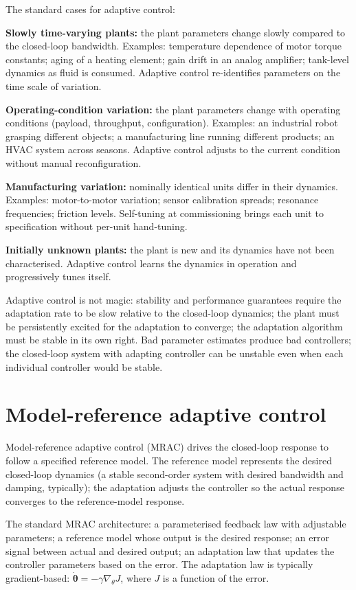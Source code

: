 The standard cases for adaptive control:

\textbf{Slowly time-varying plants:} the plant parameters change slowly compared to the closed-loop bandwidth. Examples: temperature dependence of motor torque constants; aging of a heating element; gain drift in an analog amplifier; tank-level dynamics as fluid is consumed. Adaptive control re-identifies parameters on the time scale of variation.

\textbf{Operating-condition variation:} the plant parameters change with operating conditions (payload, throughput, configuration). Examples: an industrial robot grasping different objects; a manufacturing line running different products; an HVAC system across seasons. Adaptive control adjusts to the current condition without manual reconfiguration.

\textbf{Manufacturing variation:} nominally identical units differ in their dynamics. Examples: motor-to-motor variation; sensor calibration spreads; resonance frequencies; friction levels. Self-tuning at commissioning brings each unit to specification without per-unit hand-tuning.

\textbf{Initially unknown plants:} the plant is new and its dynamics have not been characterised. Adaptive control learns the dynamics in operation and progressively tunes itself.

Adaptive control is not magic: stability and performance guarantees require the adaptation rate to be slow relative to the closed-loop dynamics; the plant must be persistently excited for the adaptation to converge; the adaptation algorithm must be stable in its own right. Bad parameter estimates produce bad controllers; the closed-loop system with adapting controller can be unstable even when each individual controller would be stable.

\section{Model-reference adaptive control}

Model-reference adaptive control (MRAC) drives the closed-loop response to follow a specified reference model. The reference model represents the desired closed-loop dynamics (a stable second-order system with desired bandwidth and damping, typically); the adaptation adjusts the controller so the actual response converges to the reference-model response.

The standard MRAC architecture: a parameterised feedback law with adjustable parameters; a reference model whose output is the desired response; an error signal between actual and desired output; an adaptation law that updates the controller parameters based on the error. The adaptation law is typically gradient-based: $\dot{\boldsymbol{\theta}} = -\gamma \nabla_\theta J$, where $J$ is a function of the error.

